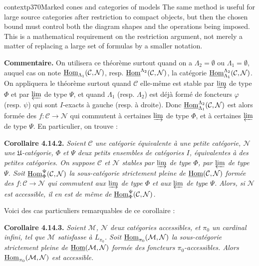 \begin{dcomment}{context}{p370}{Marked cones and categories of models}
The same method is useful for large source categories after restriction to compact objects, but then the chosen bound must control both the diagram shapes and the operations being imposed. This is a mathematical requirement on the restriction argument, not merely a matter of replacing a large set of formulas by a smaller notation.
\end{dcomment}


\noindent\textbf{Commentaire.} On utilisera ce théorème surtout quand on a $\Lambda_2=\emptyset$ ou $\Lambda_1=\emptyset$, auquel cas on note $\underline{\mathrm{Hom}}_{\Lambda_1}(\mathcal{C},\mathcal{N})$, resp. $\underline{\mathrm{Hom}}^{\Lambda_2}(\mathcal{C},\mathcal{N})$, la catégorie $\underline{\mathrm{Hom}}^{\Lambda_2}_{\Lambda_1}(\mathcal{C},\mathcal{N})$. On appliquera le théorème surtout quand $\mathcal{C}$ elle-même est stable par $\varinjlim$ de type $\Phi$ et par $\varprojlim$ de type $\Psi$, et quand $\Lambda_1$ (resp. $\Lambda_2$) est déjà formé de foncteurs $\varphi$ (resp. $\psi$) qui sont $I$-exacts à gauche (resp. à droite). Donc $\underline{\mathrm{Hom}}^{\Lambda_2}_{\Lambda_1}(\mathcal{C},\mathcal{N})$ est alors formée des $f:\mathcal{C}\longrightarrow\mathcal{N}$ qui commutent à certaines $\varinjlim$ de type $\Phi$, et à certaines $\varprojlim$ de type $\Psi$. En particulier, on trouve :


\noindent\textbf{Corollaire 4.14.2.} {\itshape Soient $\mathcal{C}$ une catégorie équivalente à une petite catégorie, $\mathcal{N}$ une $\mathfrak{U}$-catégorie, $\Phi$ et $\Psi$ deux petits ensembles de catégories $I$, équivalentes à des petites catégories. On suppose $\mathcal{C}$ et $\mathcal{N}$ stables par $\varinjlim$ de type $\Phi$, par $\varprojlim$ de type $\Psi$. Soit $\underline{\mathrm{Hom}}^{\Psi}_{\Phi}(\mathcal{C},\mathcal{N})$ la sous-catégorie strictement pleine de $\underline{\mathrm{Hom}}(\mathcal{C},\mathcal{N})$ formée des $f:\mathcal{C}\longrightarrow\mathcal{N}$ qui commutent aux $\varinjlim$ de type $\Phi$ et aux $\varprojlim$ de type $\Psi$. Alors, si $\mathcal{N}$ est accessible, il en est de même de $\underline{\mathrm{Hom}}^{\Psi}_{\Phi}(\mathcal{C},\mathcal{N})$.}

Voici des cas particuliers remarquables de ce corollaire :

\noindent\textbf{Corollaire 4.14.3.} {\itshape Soient $\mathcal{M}$, $\mathcal{N}$ deux catégories accessibles, et $\pi_0$ un cardinal infini, tel que $\mathcal{M}$ satisfasse à $L_{\pi_0}$. Soit $\underline{\mathrm{Hom}}_{\pi_0}(\mathcal{M},\mathcal{N})$ la sous-catégorie strictement pleine de $\underline{\mathrm{Hom}}(\mathcal{M},\mathcal{N})$ formée des foncteurs $\pi_0$-accessibles. Alors $\underline{\mathrm{Hom}}_{\pi_0}(\mathcal{M},\mathcal{N})$ est accessible.}

